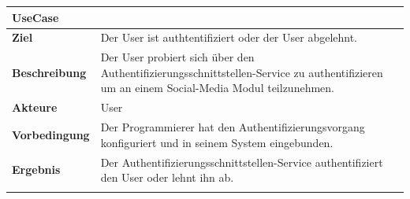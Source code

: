 \begin{longtable}[c]{@{}ll@{}}
\toprule
\begin{minipage}[b]{0.34\columnwidth}\raggedright\strut
\textbf{UseCase}
\strut\end{minipage} &
\begin{minipage}[b]{0.60\columnwidth}\raggedright\strut
\strut\end{minipage}\tabularnewline
\midrule
\endhead
\begin{minipage}[t]{0.34\columnwidth}\raggedright\strut
\textbf{Ziel}
\strut\end{minipage} &
\begin{minipage}[t]{0.60\columnwidth}\raggedright\strut
Der User ist authtentifiziert oder der User abgelehnt.
\strut\end{minipage}\tabularnewline
\begin{minipage}[t]{0.34\columnwidth}\raggedright\strut
\textbf{Beschreibung}
\strut\end{minipage} &
\begin{minipage}[t]{0.60\columnwidth}\raggedright\strut
Der User probiert sich über den Authentifizierungsschnittstellen-Service
zu authentifizieren um an einem Social-Media Modul teilzunehmen.
\strut\end{minipage}\tabularnewline
\begin{minipage}[t]{0.34\columnwidth}\raggedright\strut
\textbf{Akteure}
\strut\end{minipage} &
\begin{minipage}[t]{0.60\columnwidth}\raggedright\strut
User
\strut\end{minipage}\tabularnewline
\begin{minipage}[t]{0.34\columnwidth}\raggedright\strut
\textbf{Vorbedingung}
\strut\end{minipage} &
\begin{minipage}[t]{0.60\columnwidth}\raggedright\strut
Der Programmierer hat den Authentifizierungsvorgang konfiguriert und in
seinem System eingebunden.
\strut\end{minipage}\tabularnewline
\begin{minipage}[t]{0.34\columnwidth}\raggedright\strut
\textbf{Ergebnis}
\strut\end{minipage} &
\begin{minipage}[t]{0.60\columnwidth}\raggedright\strut
Der Authentifizierungsschnittstellen-Service authentifiziert den User
oder lehnt ihn ab.
\strut\end{minipage}\tabularnewline
\begin{minipage}[t]{0.34\columnwidth}\raggedright\strut

\end{minipage}
\end{longtable}
